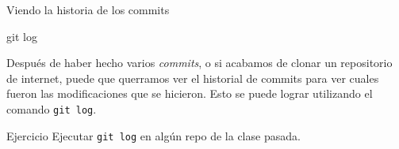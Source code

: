 \begin{frame}[t]{Viendo la historia de los commits}
    \begin{comando}
        git log
    \end{comando}

    \pause
    \begin{block}{}
        Después de haber hecho varios \textit{commits}, o si acabamos de clonar un repositorio
        de internet, puede que querramos ver el historial de commits para ver cuales
        fueron las modificaciones que se hicieron. Esto se puede lograr utilizando el
        comando \texttt{git log}.
    \end{block}

    \pause
    \begin{ejercicio}{Ejercicio}
        Ejecutar \texttt{git log} en algún repo de la clase pasada.
    \end{ejercicio}
\end{frame}

